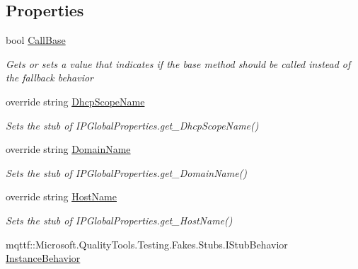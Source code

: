 \subsection*{Properties}
\begin{DoxyCompactItemize}
\item 
bool \hyperlink{class_system_1_1_net_1_1_network_information_1_1_fakes_1_1_stub_i_p_global_properties_aea964927dc2618cbb397be131a6914f8}{Call\-Base}
\begin{DoxyCompactList}\small\item\em Gets or sets a value that indicates if the base method should be called instead of the fallback behavior\end{DoxyCompactList}\item 
override string \hyperlink{class_system_1_1_net_1_1_network_information_1_1_fakes_1_1_stub_i_p_global_properties_a381c57567fc5d304840ea83572e4ebce}{Dhcp\-Scope\-Name}
\begin{DoxyCompactList}\small\item\em Sets the stub of I\-P\-Global\-Properties.\-get\-\_\-\-Dhcp\-Scope\-Name()\end{DoxyCompactList}\item 
override string \hyperlink{class_system_1_1_net_1_1_network_information_1_1_fakes_1_1_stub_i_p_global_properties_a677c65632efc4aba4dc06de974edf5a0}{Domain\-Name}
\begin{DoxyCompactList}\small\item\em Sets the stub of I\-P\-Global\-Properties.\-get\-\_\-\-Domain\-Name()\end{DoxyCompactList}\item 
override string \hyperlink{class_system_1_1_net_1_1_network_information_1_1_fakes_1_1_stub_i_p_global_properties_acc7bb486bcbe917e54f187212ac40d24}{Host\-Name}
\begin{DoxyCompactList}\small\item\em Sets the stub of I\-P\-Global\-Properties.\-get\-\_\-\-Host\-Name()\end{DoxyCompactList}\item 
mqttf\-::\-Microsoft.\-Quality\-Tools.\-Testing.\-Fakes.\-Stubs.\-I\-Stub\-Behavior \hyperlink{class_system_1_1_net_1_1_network_information_1_1_fakes_1_1_stub_i_p_global_properties_ab6d2b861c647a074f2986d0c5a1c5b5a}{Instance\-Behavior}

\end{DoxyCompactItemize}
